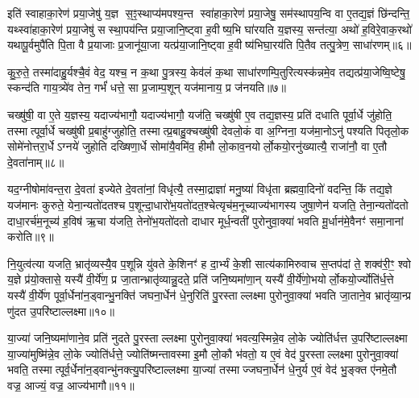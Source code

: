 इति॑ स्वाहाका॒रेण॑ प्रया॒जेषु॑ य॒ज्ञ स॒ꣵ॒स्थाप्य॑मपश्य॒न्त स्वा॑हाका॒रेण॑ प्रया॒जेषु॒ सम॑स्थापय॒न्वि वा ए॒तद्य॒ज्ञं छि॑न्दन्ति॒ यथ्स्वा॑हाका॒रेण॑ प्रया॒जेषु॑ सस्था॒पय॑न्ति प्रया॒जानि॒ष्ट्वा ह॒वीष्य॒भि घा॑रयति य॒ज्ञस्य॒ सन्त॑त्या॒ अथो॑ ह॒विरे॒वाक॒रथो॑ यथापू॒र्वमुपै॑ति पि॒ता वै प्र॒याजाः प्र॒जानू॑या॒जा यत्प्र॑या॒जानि॒ष्ट्वा ह॒वीष्य॑भिघा॒रय॑ति पि॒तैव तत्पु॒त्रेण॒ साधा॑रणम्॥६॥

कु॒रु॒ते॒ तस्मा॑दाहु॒र्यश्चै॒वं वेद॒ यश्च॒ न क॒था पु॒त्रस्य॒ केव॑लं क॒था साधा॑रणम्पि॒तुरित्यस्क॑न्नमे॒व तद्यत्प्र॑या॒जेष्वि॒ष्टेषु॒ स्कन्द॑ति गाय॒त्र्ये॑व तेन॒ गर्भं॑ धत्ते॒ सा प्र॒जाम्प॒शून् यज॑मानाय॒ प्र ज॑नयति॥७॥

{\anuvakamend[{य॒ज॒ति॒ य॒ज्ञमेवा॒व॑रुन्धे॒ तनू॒नपा॑तं यजति प्रया॒जाना॑मे॒वं वेद॒ प्र रख्षोभ्यः॒ साधा॑रण॒म्पञ्च॑त्रिशच्च॥१॥}]}

चख्षु॑षी॒ वा ए॒ते य॒ज्ञस्य॒ यदाज्य॑भागौ॒ यदाज्य॑भागौ॒ यज॑ति॒ चख्षु॑षी ए॒व तद्य॒ज्ञस्य॒ प्रति॑ दधाति पूर्वा॒र्धे जु॑होति॒ तस्मात्पूर्वा॒र्धे चख्षु॑षी प्र॒बाहु॑ग्जुहोति॒ तस्मात्प्र॒बाहु॒क्चख्षु॑षी देवलो॒कं वा अ॒ग्निना॒ यज॑मा॒नोऽनु॑ पश्यति पितृलो॒क सोमे॑नोत्तरा॒र्धेऽग्नये॑ जुहोति दख्षिणा॒र्धे सोमा॑यै॒वमि॑व॒ हीमौ लो॒काव॒नयोर्लो॒कयो॒रनु॑ख्यात्यै॒ राजा॑नौ॒ वा ए॒तौ दे॒वता॑नाम्॥८॥

यद॒ग्नीषोमा॑वन्त॒रा दे॒वता॑ इज्येते दे॒वता॑नां॒ विधृ॑त्यै॒ तस्मा॒द्राज्ञा॑ मनु॒ष्या॑ विधृ॑ता ब्रह्मवा॒दिनो॑ वदन्ति॒ किं तद्य॒ज्ञे यज॑मानः कुरुते॒ येना॒न्यतो॑दतश्च प॒शून्दा॒धारो॑भ॒यतो॑दत॒श्चेत्यृच॑म॒नूच्याज्य॑भागस्य जुषा॒णेन॑ यजति॒ तेना॒न्यतो॑दतो दाधा॒रर्च॑म॒नूच्य॑ ह॒विष॑ ऋ॒चा य॑जति॒ तेनो॑भ॒यतो॑दतो दाधार मूर्ध॒न्वती॑ पुरोनुवा॒क्या॑ भवति मू॒र्धान॑मे॒वैनꣳ॑ समा॒नानां करोति॥९॥

नि॒युत्व॑त्या यजति॒ भ्रातृ॑व्यस्यै॒व प॒शून्नि यु॑वते के॒शिनꣳ॑ ह दा॒र्भ्यं के॒शी सात्य॑कामिरुवाच स॒प्तप॑दां ते॒ शक्व॑री॒ꣳ॒ श्वो य॒ज्ञे प्र॑यो॒क्तासे॒ यस्यै॑ वी॒र्ये॑ण॒ प्र जा॒तान्भ्रातृ॑व्यान्नु॒दते॒ प्रति॑ जनि॒ष्यमा॑णा॒न् यस्यै॑ वी॒र्ये॑णो॒भयोर्लो॒कयो॒र्ज्योति॑र्ध॒त्ते यस्यै॑ वी॒र्ये॑ण पूर्वा॒र्धेना॑न॒ड्वान्भु॒नक्ति॑ जघना॒र्धेन॑ धे॒नुरिति॑ पु॒रस्ताल्लक्ष्मा पुरोनुवा॒क्या॑ भवति जा॒ताने॒व भ्रातृ॑व्या॒न्प्र णु॑दत उ॒परि॑ष्टाल्लक्ष्मा॥१०॥

या॒ज्या॑ जनि॒ष्यमा॑णाने॒व प्रति॑ नुदते पु॒रस्ताल्लक्ष्मा पुरोनुवा॒क्या॑ भवत्य॒स्मिन्ने॒व लो॒के ज्योति॑र्धत्त उ॒परि॑ष्टाल्लक्ष्मा या॒ज्या॑मुष्मि॑न्ने॒व लो॒के ज्योति॑र्धत्ते॒ ज्योति॑ष्मन्तावस्मा इ॒मौ लो॒कौ भ॑वतो॒ य ए॒वं वेद॑ पु॒रस्ताल्लक्ष्मा पुरोनुवा॒क्या॑ भवति॒ तस्मात्पूर्व॒र्धेना॑न॒ड्वान्भु॑नक्त्यु॒परि॑ष्टाल्लक्ष्मा या॒ज्या॑ तस्माज्जघना॒र्धेन॑ धे॒नुर्य ए॒वं वेद॑ भु॒ङ्क्त ए॑नमे॒तौ वज्र॒ आज्यं॒ वज्र॒ आज्य॑भागौ॥११॥

